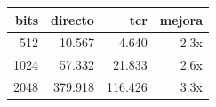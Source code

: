 \begin{tabular}{rrrr}
\toprule
bits & directo & tcr & mejora \\
\midrule
512 & 10.567 & 4.640 & 2.3x \\
1024 & 57.332 & 21.833 & 2.6x \\
2048 & 379.918 & 116.426 & 3.3x \\
\bottomrule
\end{tabular}
